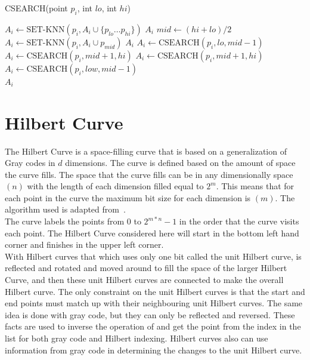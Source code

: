 \documentclass[10pt]{article}
\begin{document}
\begin{algorithm}
  \caption{CSEARCH(point $p_i$, int $lo$, int $hi$)}
  \label{csearch}
  \begin{algorithmic}[1]
    \State $A_i \leftarrow \text{SET-KNN}(p_i, A_i \cup \{ p_{lo} \dots p_{hi} \})$
    \Return $A_i$
    \EndIf
    \State $mid \leftarrow (hi+lo)/2$
    \State $A_i \leftarrow \text{SET-KNN}(p_i, A_i \cup p_{mid})$
    \Return $A_i$
    \EndIf
    \State $A_i \leftarrow \text{CSEARCH}(p_i, lo, mid-1)$
    \State $A_i \leftarrow \text{CSEARCH}(p_i, mid+1, hi)$
    \EndIf
    \Else
    \State $A_i \leftarrow \text{CSEARCH}(p_i, mid+1, hi)$
    \State $A_i \leftarrow \text{CSEARCH}(p_i, low, mid - 1)$
    \EndIf
    \EndIf \\
    \Return $A_i$
    
  \end{algorithmic}
\end{algorithm}


\section{Hilbert Curve}

The Hilbert Curve is a space-filling curve that is based on a generalization of Gray codes in $d$ dimensions. The curve is defined based on the amount of space the curve fills. The space that the curve fills can be in any dimensionally space $(n)$ with the length of each dimension filled equal to $2^m$. This means that for each point in the curve the maximum bit size for each dimension is $(m)$. The algorithm used is adapted from~\cite{Hamilton:2006}. \\

The curve labels the points from $0$ to $2^{m*n} - 1$ in the order that the curve visits each point. The Hilbert Curve considered here will start in the bottom left hand corner and finishes in the upper left corner. \\

With Hilbert curves that which uses only one bit called the unit Hilbert curve, is reflected and rotated and moved around to fill the space of the larger Hilbert Curve, and then these unit Hilbert curves are connected to make the overall Hilbert curve. The only constraint on the unit Hilbert curves is that the start and end points must match up with their neighbouring unit Hilbert curves. The same idea is done with gray code, but they  can only be reflected and reversed. These facts are used to inverse the operation of and get the point from the index in the list for both gray code and Hilbert indexing. Hilbert curves also can use information from gray code in determining the changes to the unit Hilbert curve.
 
\end{document}

